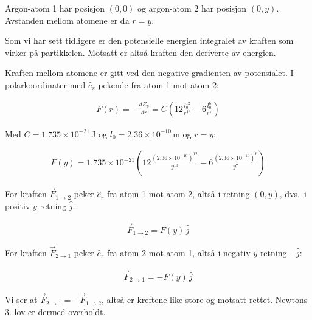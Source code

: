 \subsubsection{}

Argon-atom 1 har posisjon $(0, 0)$ og argon-atom 2 har posisjon $(0, y)$.
Avstanden mellom atomene er da $r = y$.

Som vi har sett tidligere er den potensielle energien integralet av kraften som virker på partikkelen. Motsatt er altså kraften den deriverte av energien.

Kraften mellom atomene er gitt ved den negative gradienten av potensialet.
I polarkoordinater med $\hat{e}_r$ pekende fra atom 1 mot atom 2:

\begin{align}
F(r) = -\frac{dE_p}{dr} = C\left(12\frac{l_0^{12}}{r^{13}} - 6\frac{l_0^6}{r^7}\right)
\end{align}

Med $C = 1.735 \times 10^{-21}$\,J og $l_0 = 2.36 \times 10^{-10}$\,m og $r = y$:

\begin{align}
F(y) = 1.735 \times 10^{-21} \left(12\frac{(2.36 \times 10^{-10})^{12}}{y^{13}} - 6\frac{(2.36 \times 10^{-10})^{6}}{y^{7}}\right)
\end{align}

For kraften $\vec{F}_{1\to2}$ peker $\hat{e}_r$ fra atom 1 mot atom 2,
altså i retning $(0, y)$, dvs.\ i positiv $y$-retning $\hat{j}$:

\begin{align}
\vec{F}_{1\to2} = F(y)\,\hat{j}
\end{align}

For kraften $\vec{F}_{2\to1}$ peker $\hat{e}_r$ fra atom 2 mot atom 1,
altså i negativ $y$-retning $-\hat{j}$:

\begin{align}
\vec{F}_{2\to1} = -F(y)\,\hat{j}
\end{align}

Vi ser at $\vec{F}_{2\to1} = -\vec{F}_{1\to2}$, altså er kreftene like store og motsatt rettet.
Newtons 3. lov er dermed overholdt.

\newpage